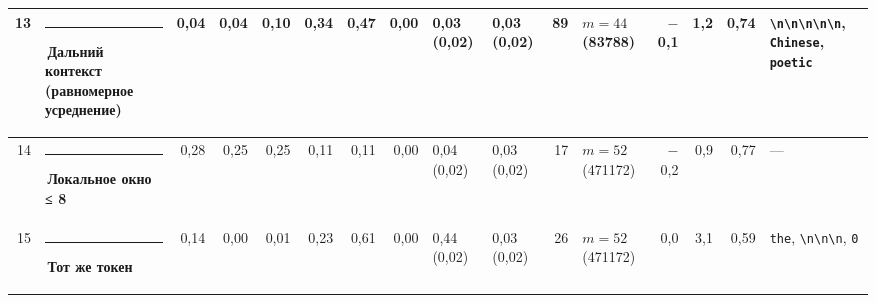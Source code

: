 \documentclass[10pt]{article}
\begin{document}
\begin{minipage}{\linewidth}
\begin{center}
{\begin{tabular}{|r|l|r|r|r|r|r|r|l|l|r|l|r|r|r|l|}
13 & \textcolor[HTML]{C3C2B7}{\rule{0.62em}{0.62em}}\,Дальний контекст (равномерное усреднение) & 0,04 & 0,04 & 0,10 & 0,34 & 0,47 & 0,00 & 0,03 (0,02) & 0,03 (0,02) & 89 & $m{=}44$ (83788) & $-$0,1 & 1,2 & 0,74 & \texttt{\textvisiblespace{}\textbackslash{}n\textbackslash{}n\textbackslash{}n\textbackslash{}n\textbackslash{}n}, \texttt{\textvisiblespace{}Chinese}, \texttt{\textvisiblespace{}poetic} \\ \hline
14 & \textcolor[HTML]{1BAF7A}{\rule{0.62em}{0.62em}}\,\textbf{Локальное окно ≤ 8} & 0,28 & 0,25 & 0,25 & 0,11 & 0,11 & 0,00 & 0,04 (0,02) & 0,03 (0,02) & 17 & $m{=}52$ (471172) & $-$0,2 & 0,9 & 0,77 & — \\ \hline
15 & \textcolor[HTML]{E87BA4}{\rule{0.62em}{0.62em}}\,\textbf{Тот же токен} & 0,14 & 0,00 & 0,01 & 0,23 & 0,61 & 0,00 & 0,44 (0,02) & 0,03 (0,02) & 26 & $m{=}52$ (471172) & 0,0 & 3,1 & 0,59 & \texttt{\textvisiblespace{}the}, \texttt{\textvisiblespace{}\textbackslash{}n\textbackslash{}n\textbackslash{}n}, \texttt{0} \\ \hline
\hline\end{tabular}}\end{center}
\end{minipage}
\par\vspace{0.4em}
\end{document}
